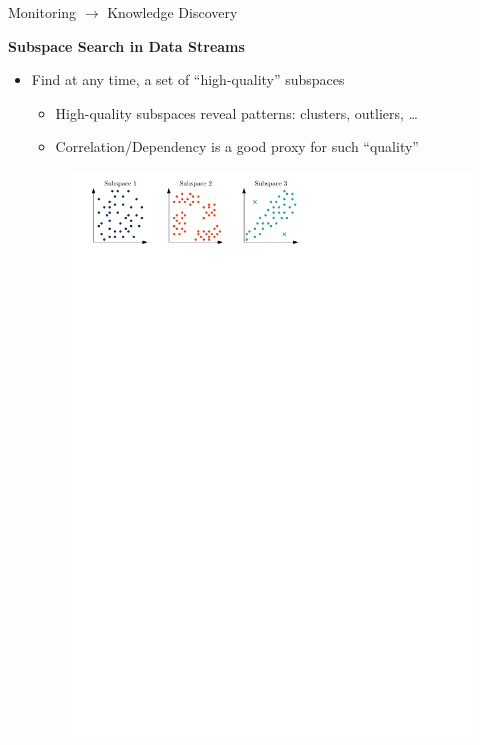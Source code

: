 \documentclass[16pt,usenames,dvipsnames, notheorems]{beamer}
\theoremstyle{definition}
\theoremstyle{example}
\theoremstyle{plain}
\begin{document}
\begin{frame}{Monitoring $\rightarrow$ Knowledge Discovery}
	
\textbf{Subspace Search in Data Streams} 

\begin{itemize}
	\item Find at any time, a set of ``high-quality'' subspaces
	\begin{itemize}
		\item High-quality subspaces reveal patterns: clusters, outliers, \dots
		\pause
		\item Correlation/Dependency is a good proxy for such ``quality'' 
	\end{itemize}
	
\begin{figure}
	\centering
	\begin{overprint}[0.8\linewidth]
	 \includegraphics[width=\linewidth]{figures/subspace_example_1-compressed.pdf}

\end{overprint}
\end{figure}
\end{itemize}
\end{frame}
\end{document}
